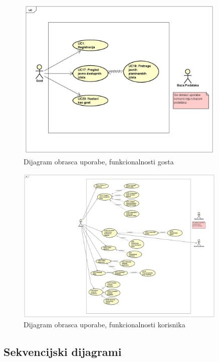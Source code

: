 			\begin{figure}[H]
				\centering
				\includegraphics[width=0.9\textwidth]{slike/UC-Gost.jpg}
				\caption{Dijagram obrasca uporabe, funkcionalnosti gosta}
				\label{fig:mesh3}
			\end{figure}
		
			\begin{figure}[H]
				\centering
				\includegraphics[width=0.9\textwidth]{slike/UC-Korisnik.jpg}
				\caption{Dijagram obrasca uporabe, funkcionalnosti korisnika}
				\label{fig:mesh4}
			\end{figure}
\newpage
	
	
		\subsection{Sekvencijski dijagrami}
		
